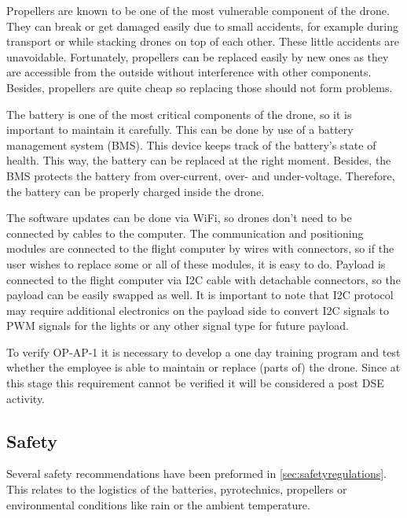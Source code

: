 Propellers are known to be one of the most vulnerable component of the drone. They can break or get damaged easily due to small accidents, for example during transport or while stacking drones on top of each other. These little accidents are unavoidable. Fortunately, propellers can be replaced easily by new ones as they are accessible from the outside without interference with other components. Besides, propellers are quite cheap so replacing those should not form problems.

The battery is one of the most critical components of the drone, so it is important to maintain it carefully. This can be done by use of a battery management system (BMS). This device keeps track of the battery's state of health. This way, the battery can be replaced at the right moment. Besides, the BMS protects the battery from over-current, over- and under-voltage. Therefore, the battery can be properly charged inside the drone. 

The software updates can be done via WiFi, so drones don't need to be connected by cables to the computer. The communication and positioning modules are connected to the flight computer by wires with connectors, so if the user wishes to replace some or all of these modules, it is easy to do. Payload is connected to the flight computer via I2C cable with detachable connectors, so the payload can be easily swapped as well. It is important to note that I2C protocol may require additional electronics on the payload side to convert I2C signals to PWM signals for the lights or any other signal type for future payload.   

To verify OP-AP-1\label{req:OP-AP-1} it is necessary to develop a one day training program and test whether the employee is able to maintain or replace (parts of) the drone. Since at this stage this requirement cannot be verified it will be considered a post DSE activity.



\subsection{Safety} %

Several safety recommendations have been preformed in \autoref{sec:safetyregulations}. This relates to the logistics of the batteries, pyrotechnics, propellers or environmental conditions like rain or the ambient temperature.





